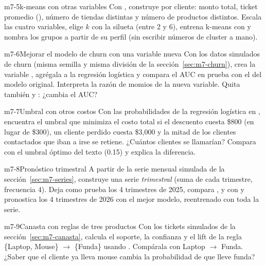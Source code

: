 \begin{ejercicio}{m7-5}{k-means con otras variables}
Con , construye por cliente: monto total, ticket
promedio (), número de tiendas distintas y
número de productos distintos. Escala las cuatro variables, elige $k$ con la
silueta (entre 2 y 6), entrena k-means con  y nombra los
grupos a partir de su perfil (sin escribir números de cluster a mano).
\end{ejercicio}

\begin{ejercicio}{m7-6}{Mejorar el modelo de churn con una variable nueva}
Con los datos simulados de churn (misma semilla y misma división de la
sección~\ref{sec:m7-churn}), crea la variable
, agrégala a la regresión
logística y compara el AUC en prueba con el del modelo original. Interpreta la
razón de momios de la nueva variable. Quita también  y
: ¿cambia el AUC?
\end{ejercicio}

\begin{ejercicio}{m7-7}{Umbral con otros costos}
Con las probabilidades de la regresión logística en ,
encuentra el umbral que minimiza el costo total si el descuento cuesta \$800
(en lugar de \$300), un cliente perdido cuesta \$3{,}000 y la mitad de los
clientes contactados que iban a irse se retiene. ¿Cuántos clientes se
llamarían? Compara con el umbral óptimo del texto (0.15) y explica la
diferencia.
\end{ejercicio}

\begin{ejercicio}{m7-8}{Pronóstico trimestral}
A partir de la serie mensual simulada de la sección~\ref{sec:m7-series},
construye una serie \emph{trimestral} (suma de cada trimestre, frecuencia 4).
Deja como prueba los 4 trimestres de 2025, compara ,
 y  con  y pronostica
los 4 trimestres de 2026 con el mejor modelo, reentrenado con toda la serie.
\end{ejercicio}

\begin{ejercicio}{m7-9}{Canasta con reglas de tres productos}
Con los tickets simulados de la sección~\ref{sec:m7-canasta}, calcula el
soporte, la confianza y el lift de la regla \{Laptop, Mouse\} $\rightarrow$
\{Funda\} usando . Compárala con Laptop $\rightarrow$ Funda.
¿Saber que el cliente ya lleva mouse cambia la probabilidad de que lleve funda?
\end{ejercicio}

